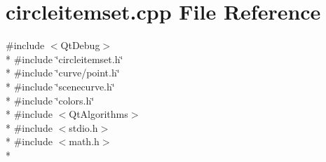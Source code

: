 \section{circleitemset.\+cpp File Reference}
\label{bk3_2circles_2circleitemset_8cpp}
{\ttfamily \#include $<$Qt\+Debug$>$}\\*
{\ttfamily \#include \char`\"{}circleitemset.\+h\char`\"{}}\\*
{\ttfamily \#include \char`\"{}curve/point.\+h\char`\"{}}\\*
{\ttfamily \#include \char`\"{}scenecurve.\+h\char`\"{}}\\*
{\ttfamily \#include \char`\"{}colors.\+h\char`\"{}}\\*
{\ttfamily \#include $<$Qt\+Algorithms$>$}\\*
{\ttfamily \#include $<$stdio.\+h$>$}\\*
{\ttfamily \#include $<$math.\+h$>$}\\*
